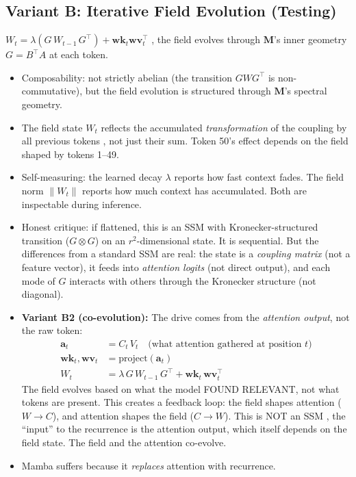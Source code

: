 \documentclass[11pt, a4paper]{article}
\newcommand{\M}{\mathbf{M}}
\theoremstyle{plain}
\theoremstyle{definition}
\theoremstyle{remark}
\begin{document}
\subsection{Variant B: Iterative Field Evolution (Testing)}

$W_t = \lambda (G \, W_{t-1} \, G^\top) + \mathbf{wk}_t \mathbf{wv}_t^\top$ ,  the field evolves through $\M$'s inner geometry $G = B^\top A$ at each token.
\begin{itemize}[nosep]
\item Composability: not strictly abelian (the transition $G W G^\top$ is non-commutative), but the field evolution is structured through $\M$'s spectral geometry.
\item The field state $W_t$ reflects the accumulated \emph{transformation} of the coupling by all previous tokens ,  not just their sum. Token 50's effect depends on the field shaped by tokens 1--49.
\item Self-measuring: the learned decay $\lambda$ reports how fast context fades. The field norm $\|W_t\|$ reports how much context has accumulated. Both are inspectable during inference.
\item Honest critique: if flattened, this is an SSM with Kronecker-structured transition ($G \otimes G$) on an $r^2$-dimensional state. It is sequential. But the differences from a standard SSM are real: the state is a \emph{coupling matrix} (not a feature vector), it feeds into \emph{attention logits} (not direct output), and each mode of $G$ interacts with others through the Kronecker structure (not diagonal).
\item \textbf{Variant B2 (co-evolution):} The drive comes from the \emph{attention output}, not the raw token:
\begin{align}
\mathbf{a}_t &= C_t \, V_t \quad \text{(what attention gathered at position $t$)} \\
\mathbf{wk}_t, \mathbf{wv}_t &= \text{project}(\mathbf{a}_t) \\
W_t &= \lambda \, G \, W_{t-1} \, G^\top + \mathbf{wk}_t \, \mathbf{wv}_t^\top
\end{align}
The field evolves based on what the model FOUND RELEVANT, not what tokens are present.
This creates a feedback loop: the field shapes attention ($W \to C$), and attention shapes the field ($C \to W$).
This is NOT an SSM ,  the ``input'' to the recurrence is the attention output, which itself depends on the field state.
The field and the attention co-evolve.
\item Mamba suffers because it \emph{replaces} attention with recurrence.

\end{itemize}
\end{document}
